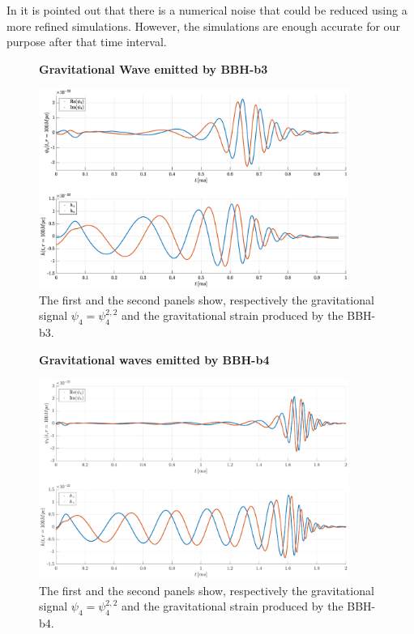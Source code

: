 In \cite{loffler_einstein_2012} it is pointed out that there is a numerical noise that could be reduced using a more refined simulations. However,   the simulations are enough accurate for our purpose after that time interval.\\ 
\begin{figure}[H]
\centering
    \textbf{Gravitational Wave emitted by BBH-b3}\par\medskip
\centering
\includegraphics[width=0.9\textwidth]{numerical_evolution/gw_b3.eps}
\caption{The first and the second panels show, respectively the gravitational signal $\psi_4=\psi_4 ^{2,2}$ and the gravitational strain produced by the BBH-b3.}
   \label{gw_b3}
 \end{figure}
\begin{figure}[H]
\centering
    \textbf{Gravitational waves emitted by BBH-b4}\par\medskip
\centering
   \includegraphics[width=0.9\textwidth]{numerical_evolution/gw_b4.eps}
   \caption{The first and the second panels show, respectively the gravitational signal $\psi_4=\psi_4 ^{2,2}$ and the gravitational strain produced by the BBH-b4.}
\label{gw_b4} 
\end{figure}
